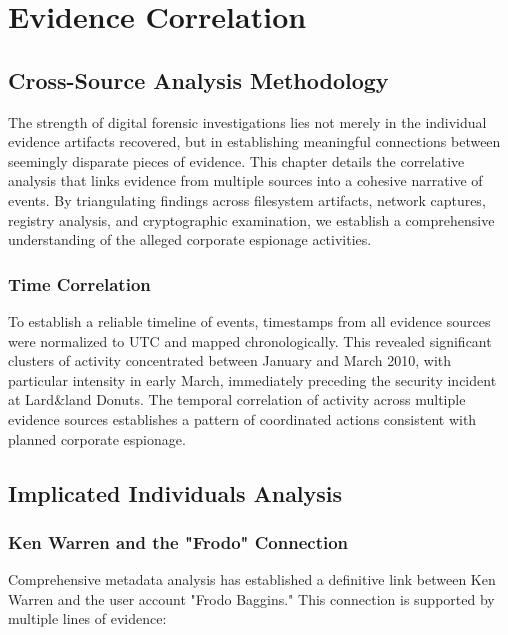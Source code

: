 \chapter{Evidence Correlation}

\section{Cross-Source Analysis Methodology}
The strength of digital forensic investigations lies not merely in the individual evidence artifacts recovered, but in establishing meaningful connections between seemingly disparate pieces of evidence. This chapter details the correlative analysis that links evidence from multiple sources into a cohesive narrative of events. By triangulating findings across filesystem artifacts, network captures, registry analysis, and cryptographic examination, we establish a comprehensive understanding of the alleged corporate espionage activities.

\subsection{Time Correlation }
To establish a reliable timeline of events, timestamps from all evidence sources were normalized to UTC and mapped chronologically. This revealed significant clusters of activity concentrated between January and March 2010, with particular intensity in early March, immediately preceding the security incident at Lard\&land Donuts. The temporal correlation of activity across multiple evidence sources establishes a pattern of coordinated actions consistent with planned corporate espionage.

\section{Implicated Individuals Analysis}
\subsection{Ken Warren and the "Frodo" Connection}
Comprehensive metadata analysis has established a definitive link between Ken Warren and the user account "Frodo Baggins." This connection is supported by multiple lines of evidence:

